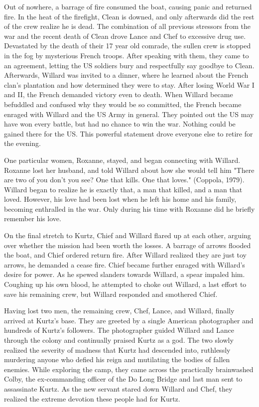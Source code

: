 \documentclass[a4paper,man,natbib]{apa6}
\begin{document}
Out of nowhere, a barrage of fire consumed the boat, causing panic and returned fire. In the heat of the firefight, Clean is downed, and only afterwards did the rest of the crew realize he is dead. 
The combination of all previous stressors from the war and the recent death of Clean drove Lance and Chef to excessive drug use. Devastated by the death of their 17 year old comrade, the sullen crew is stopped in the fog by mysterious French troops. After speaking with them, they came to an agreement, letting the US soldiers bury and respectfully say goodbye to Clean. Afterwards, Willard was invited to a dinner, where he learned about the French clan's plantation and how determined they were to stay. After losing World War I and II, the French demanded victory even to death. When Willard became befuddled and confused why they would be so committed, the French became enraged with Willard and the US Army in general. They pointed out the US may have won every battle, but had no chance to win the war. Nothing could be gained there for the US. This powerful statement drove everyone else to retire for the evening.

One particular women, Roxanne, stayed, and began connecting with Willard. Roxanne lost her husband, and told Willard about how she would tell him "There are two of you don't you see? One that kills. One that loves." (Coppola, 1979). Willard began to realize he is exactly that, a man that killed, and a man that loved. However, his love had been lost when he left his home and his family, becoming enthralled in the war. Only during his time with Roxanne did he briefly remember his love.

On the final stretch to Kurtz, Chief and Willard flared up at each other, arguing over whether the mission had been worth the losses. A barrage of arrows flooded the boat, and Chief ordered return fire. After Willard realized they are just toy arrows, he demanded a cease fire. Chief became further enraged with Willard's desire for power. As he spewed slanders towards Willard, a spear impaled him. Coughing up his own blood, he attempted to choke out Willard, a last effort to save his remaining crew, but Willard responded and smothered Chief.

Having lost two men, the remaining crew, Chef, Lance, and Willard, finally arrived at Kurtz's base. They are greeted by a single American photographer and hundreds of Kurtz's followers. The photographer guided Willard and Lance through the colony and continually praised Kurtz as a god. The two slowly realized the severity of madness that Kurtz had descended into, ruthlessly murdering anyone who defied his reign and mutilating the bodies of fallen enemies. While exploring the camp, they came across the practically brainwashed Colby, the ex-commanding officer of the Do Long Bridge and last man sent to assassinate Kurtz. As the new servant stared down Willard and Chef, they realized the extreme devotion these people had for Kurtz.
\end{document}
